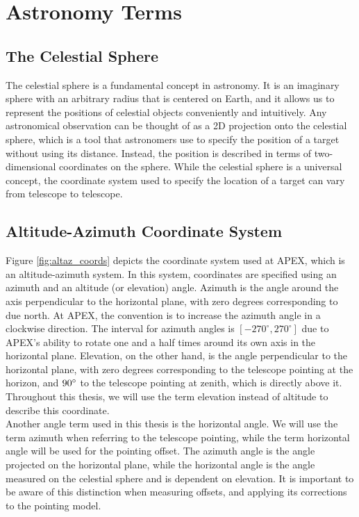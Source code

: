 \section{Astronomy Terms}
\subsection{The Celestial Sphere}
The celestial sphere is a fundamental concept in astronomy.
It is an imaginary sphere with an arbitrary radius that is centered on Earth, and it allows us to represent the positions of celestial objects conveniently and intuitively.
Any astronomical observation can be thought of as a 2D projection onto the celestial sphere, which is a tool that astronomers use to specify the position of a target without using its distance.
Instead, the position is described in terms of two-dimensional coordinates on the sphere.
While the celestial sphere is a universal concept, the coordinate system used to specify the location of a target can vary from telescope to telescope.




\subsection{Altitude-Azimuth Coordinate System}
Figure \ref{fig:altaz_coords} depicts the coordinate system used at APEX, which is an altitude-azimuth system.
In this system, coordinates are specified using an azimuth and an altitude (or elevation) angle.
Azimuth is the angle around the axis perpendicular to the horizontal plane, with zero degrees corresponding to due north.
At APEX, the convention is to increase the azimuth angle in a clockwise direction.
The interval for azimuth angles is $[-270^\circ,270^\circ]$ due to APEX's ability to rotate one and a half times around its own axis in the horizontal plane.
Elevation, on the other hand, is the angle perpendicular to the horizontal plane, with zero degrees corresponding to the telescope pointing at the horizon, and $90^\circ$ to the telescope pointing at zenith, which is directly above it.
Throughout this thesis, we will use the term elevation instead of altitude to describe this coordinate.\\

Another angle term used in this thesis is the horizontal angle.
We will use the term azimuth when referring to the telescope pointing, while the term horizontal angle will be used for the pointing offset.
The azimuth angle is the angle projected on the horizontal plane, while the horizontal angle is the angle measured on the celestial sphere and is dependent on elevation.
It is important to be aware of this distinction when measuring offsets, and applying its corrections to the pointing model.

